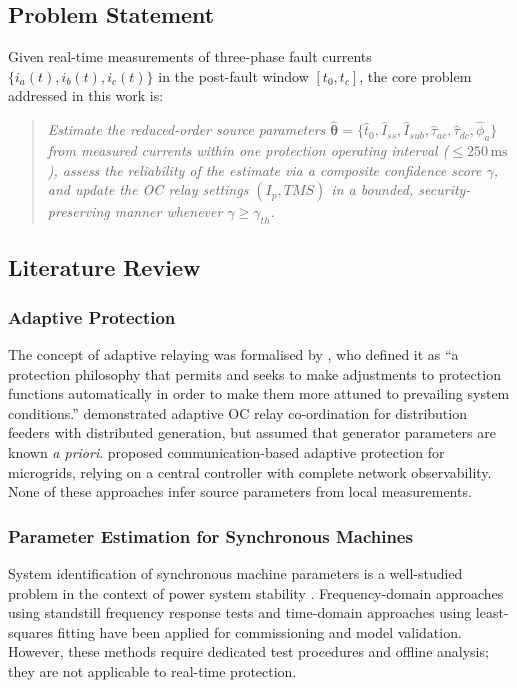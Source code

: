 \documentclass[12pt, a4paper]{article}
\theoremstyle{definition}
\theoremstyle{plain}
\newcommand{\vect}[1]{\bm{#1}}
\begin{document}
\subsection{Problem Statement}
\label{sec:intro:problem}

Given real-time measurements of three-phase fault currents
$\{i_a(t), i_b(t), i_c(t)\}$ in the post-fault window $[t_0, t_c]$, the
core problem addressed in this work is:

\begin{quote}
\textit{Estimate the reduced-order source parameters
$\hat{\vect{\theta}} = \{\hat{t}_0, \hat{I}_{ss}, \hat{I}_{sub},
\hat{\tau}_{ac}, \hat{\tau}_{dc}, \hat{\phi}_a\}$
from measured currents within one protection operating interval
($\leq 250\,\text{ms}$), assess the reliability of the estimate via a
composite confidence score $\gamma$, and update the OC relay settings
$(I_p, TMS)$ in a bounded, security-preserving manner whenever
$\gamma \geq \gamma_{th}$.}
\end{quote}

\subsection{Literature Review}
\label{sec:intro:litreview}

\subsubsection{Adaptive Protection}

The concept of adaptive relaying was formalised by \citet{Phadke2009}, who
defined it as ``a protection philosophy that permits and seeks to make
adjustments to protection functions automatically in order to make them more
attuned to prevailing system conditions.''  \citet{Brahma2004} demonstrated
adaptive OC relay co-ordination for distribution feeders with distributed
generation, but assumed that generator parameters are known \emph{a priori}.
\citet{Oudalov2009} proposed communication-based adaptive protection for
microgrids, relying on a central controller with complete network observability.
None of these approaches infer source parameters from local measurements.

\subsubsection{Parameter Estimation for Synchronous Machines}

System identification of synchronous machine parameters is a well-studied
problem in the context of power system stability \citep{IEEE1110}.
Frequency-domain approaches using standstill frequency response tests
\citep{Ljung1999} and time-domain approaches using least-squares fitting
\citep{Sachdev1988} have been applied for commissioning and model validation.
However, these methods require dedicated test procedures and offline analysis;
they are not applicable to real-time protection.
\end{document}
